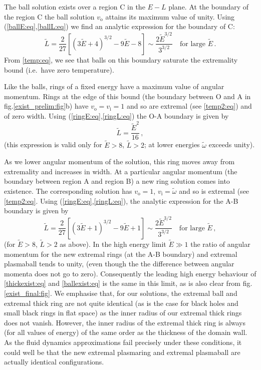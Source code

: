 \documentclass[12pt,a4paper]{article}
\newcommand{\brk}[1]{\left [ #1 \right ]}
\newcommand{\tE}{\widetilde{E}}
\newcommand{\tL}{\widetilde{L}}
\newcommand{\vi}{v_\mathrm{i}}
\newcommand{\vo}{v_\mathrm{o}}
\newcommand{\tw}{\widetilde{\omega}}
\begin{document}
The ball solution exists over a region C in the $E-L$ plane. At the
boundary of the region C the ball solution $\vo$ attains its maximum
value of unity. Using (\ref{ballE:eq},\ref{ballL:eq}) we find an
analytic expression for the boundary of C:
%
\begin{equation}\label{ballexist:eq}
  \tL = \frac{2}{27}\brk{(3\tE+4)^{3/2}-9\tE-8}
     \sim \frac{2\tE^{3/2}}{3^{3/2}}
     \quad\text{for large }\tE\,.
\end{equation}
%
From \eqref{temp:eq}, we see that balls on this boundary saturate
the extremality bound (i.e.\ have zero temperature).

Like the balls, rings of a fixed energy have a maximum value of
angular momentum. Rings at the edge of this bound (the boundary
between O and A in fig.\ref{exist_prelim:fig}b) have $\vo=\vi=1$ and
so are extremal (see \eqref{temp2:eq}) and of zero width. Using
(\ref{ringE:eq},\ref{ringL:eq}) the O-A boundary is given by
%
\begin{equation}\label{thinexist:eq}
  \tL = \frac{\tE^2}{16}\,,
\end{equation}
%
(this expression is valid only for $\tE>8$, $\tL>2$; at lower
energies $\tw$ exceeds unity).

As we lower angular momentum of the solution, this ring moves away
from extremality and increases in width. At a particular angular
momentum (the boundary between region A and region B) a new ring
solution comes into existence. The corresponding solution has
$\vo=1$, $\vi=\tw$ and so is extremal (see \eqref{temp2:eq}. Using
(\ref{ringE:eq},\ref{ringL:eq}), the analytic expression for the A-B
boundary is given by
%
\begin{equation}\label{thickexist:eq}
  \tL = \frac{2}{27}\brk{(3\tE+1)^{3/2}-9\tE+1}
     \sim \frac{2\tE^{3/2}}{3^{3/2}}
     \quad\text{for large }\tE\,,
\end{equation}
%
(for $\tE>8$, $\tL>2$ as above). In the high energy limit  $\tE \gg
1$ the ratio of angular momentum for the new extremal rings (at the
A-B boundary) and extremal plasmaball tends to unity, (even though
the the difference between angular momenta does not go to zero).
Consequently the leading high energy behaviour of
\eqref{thickexist:eq} and \eqref{ballexist:eq} is the same in this
limit,  as is also clear from fig.\ref{exist_final:fig}. We
emphasise that, for our solutions, the extremal ball and extremal
thick ring are not quite identical (as is the case for black holes
and small black rings \cite{Emparan:2001wn} in flat space) as the
inner radius of our extremal thick rings does not vanish. However,
the inner radius of the extremal thick ring is always (for all
values of energy) of the same order as the thickness of the domain
wall. As the fluid dynamics approximations fail precisely under
these conditions, it could well be that the new extremal plasmaring
and extremal plasmaball are actually identical configurations.
\end{document}

